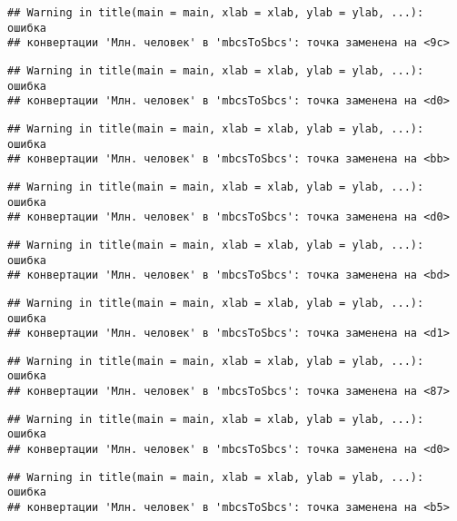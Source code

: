 \documentclass[
]{article}
\begin{document}
\begin{verbatim}
## Warning in title(main = main, xlab = xlab, ylab = ylab, ...): ошибка
## конвертации 'Млн. человек' в 'mbcsToSbcs': точка заменена на <9c>
\end{verbatim}

\begin{verbatim}
## Warning in title(main = main, xlab = xlab, ylab = ylab, ...): ошибка
## конвертации 'Млн. человек' в 'mbcsToSbcs': точка заменена на <d0>
\end{verbatim}

\begin{verbatim}
## Warning in title(main = main, xlab = xlab, ylab = ylab, ...): ошибка
## конвертации 'Млн. человек' в 'mbcsToSbcs': точка заменена на <bb>
\end{verbatim}

\begin{verbatim}
## Warning in title(main = main, xlab = xlab, ylab = ylab, ...): ошибка
## конвертации 'Млн. человек' в 'mbcsToSbcs': точка заменена на <d0>
\end{verbatim}

\begin{verbatim}
## Warning in title(main = main, xlab = xlab, ylab = ylab, ...): ошибка
## конвертации 'Млн. человек' в 'mbcsToSbcs': точка заменена на <bd>
\end{verbatim}

\begin{verbatim}
## Warning in title(main = main, xlab = xlab, ylab = ylab, ...): ошибка
## конвертации 'Млн. человек' в 'mbcsToSbcs': точка заменена на <d1>
\end{verbatim}

\begin{verbatim}
## Warning in title(main = main, xlab = xlab, ylab = ylab, ...): ошибка
## конвертации 'Млн. человек' в 'mbcsToSbcs': точка заменена на <87>
\end{verbatim}

\begin{verbatim}
## Warning in title(main = main, xlab = xlab, ylab = ylab, ...): ошибка
## конвертации 'Млн. человек' в 'mbcsToSbcs': точка заменена на <d0>
\end{verbatim}

\begin{verbatim}
## Warning in title(main = main, xlab = xlab, ylab = ylab, ...): ошибка
## конвертации 'Млн. человек' в 'mbcsToSbcs': точка заменена на <b5>
\end{verbatim}
\end{document}
